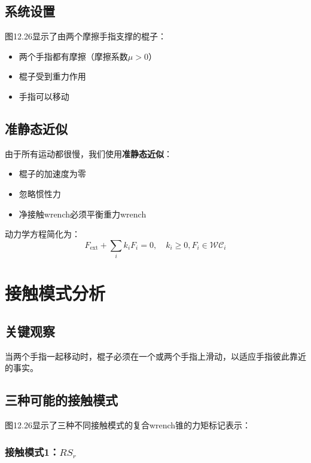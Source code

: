 \documentclass[12pt,a4paper]{article}
\begin{document}
\subsection{系统设置}

图12.26显示了由两个摩擦手指支撑的棍子：
\begin{itemize}
    \item 两个手指都有摩擦（摩擦系数$\mu > 0$）
    \item 棍子受到重力作用
    \item 手指可以移动
\end{itemize}

\subsection{准静态近似}

由于所有运动都很慢，我们使用\textbf{准静态近似}：
\begin{itemize}
    \item 棍子的加速度为零
    \item 忽略惯性力
    \item 净接触wrench必须平衡重力wrench
\end{itemize}

动力学方程简化为：
\begin{equation}
F_{\text{ext}} + \sum_i k_i F_i = 0, \quad k_i \geq 0, F_i \in \mathcal{WC}_i
\end{equation}

\section{接触模式分析}

\subsection{关键观察}

当两个手指一起移动时，棍子必须在一个或两个手指上滑动，以适应手指彼此靠近的事实。

\subsection{三种可能的接触模式}

图12.26显示了三种不同接触模式的复合wrench锥的力矩标记表示：

\subsubsection{接触模式1：$RS_r$}
\end{document}
